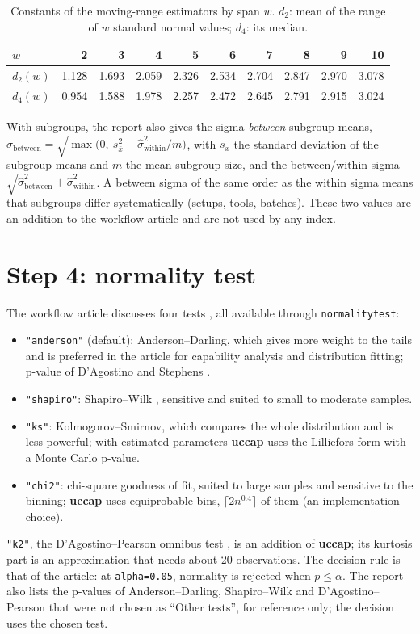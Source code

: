 \documentclass[a4paper,11pt,oneside,openany,parskip=half-,headings=standardclasses,toc=flat,numbers=noenddot]{scrbook}
\newcommand{\thead}[1]{{\sffamily\bfseries\footnotesize #1}}
\newcommand{\code}[1]{\texttt{\begingroup\def\_{\textunderscore\allowbreak}#1\endgroup}}
\newcommand{\pkg}{\textsf{\bfseries uccap}}
\begin{document}
\begin{table}[!htp]
\caption{Constants of the moving-range estimators by span $w$. $d_2$: mean of the range of $w$ standard
normal values; $d_4$: its median.}\label{tab:d2d4}
\small
\begin{tabularx}{\textwidth}{@{}l*{9}{R}@{}}
\toprule
\thead{$w$} & \thead{2} & \thead{3} & \thead{4} & \thead{5} & \thead{6} & \thead{7} & \thead{8} & \thead{9} & \thead{10}\\
\midrule
$d_2(w)$ & 1.128 & 1.693 & 2.059 & 2.326 & 2.534 & 2.704 & 2.847 & 2.970 & 3.078\\
$d_4(w)$ & 0.954 & 1.588 & 1.978 & 2.257 & 2.472 & 2.645 & 2.791 & 2.915 & 3.024\\
\bottomrule
\end{tabularx}
\end{table}

With subgroups, the report also gives the sigma \emph{between} subgroup means,
$\hat\sigma_{\text{between}} = \sqrt{\max\bigl(0,\ s_{\bar x}^2 - \hat\sigma_{\text{within}}^2/\bar m\bigr)}$, with
$s_{\bar x}$ the standard deviation of the subgroup means and $\bar m$ the mean subgroup size, and the
between/within sigma $\sqrt{\hat\sigma_{\text{between}}^2 + \hat\sigma_{\text{within}}^2}$. A between sigma of the
same order as the within sigma means that subgroups differ systematically (setups, tools, batches). These two
values are an addition to the workflow article and are not used by any index.

\section{Step 4: normality test}\label{sec:normality}
The workflow article discusses four tests \cite[Sec.~2.1]{jy-workflow}, all available through
\code{normality\_test}:
\begin{itemize}
\item \code{"anderson"} (default): Anderson--Darling, which gives more weight to the tails and is preferred in the
  article for capability analysis and distribution fitting; p-value of D'Agostino and Stephens
  \cite{dagostino-stephens}.
\item \code{"shapiro"}: Shapiro--Wilk \cite{shapiro}, sensitive and suited to small to moderate samples.
\item \code{"ks"}: Kolmogorov--Smirnov, which compares the whole distribution and is less powerful; with estimated
  parameters \pkg{} uses the Lilliefors form \cite{lilliefors} with a Monte Carlo p-value.
\item \code{"chi2"}: chi-square goodness of fit, suited to large samples and sensitive to the binning; \pkg{} uses
  equiprobable bins, $\lceil 2n^{0.4}\rceil$ of them (an implementation choice).
\end{itemize}
\code{"k2"}, the D'Agostino--Pearson omnibus test \cite{dagostino-pearson}, is an addition of \pkg{}; its
kurtosis part is an approximation that needs about 20 observations. The decision
rule is that of the article: at \code{alpha=0.05}, normality is rejected when $p \le \alpha$. The report also
lists the p-values of Anderson--Darling, Shapiro--Wilk and D'Agostino--Pearson that were not chosen as ``Other
tests'', for reference only; the decision uses the chosen test.
\end{document}

